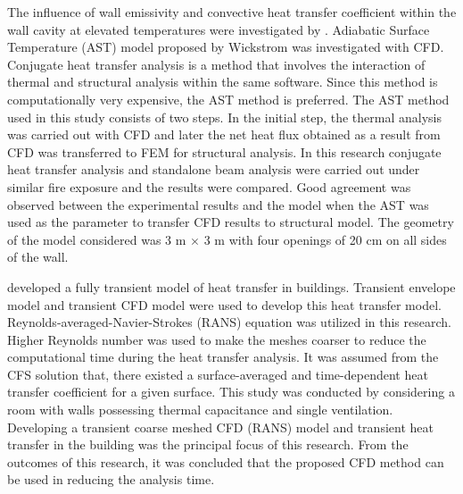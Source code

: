 The influence of wall emissivity and convective heat transfer coefficient within the wall cavity at elevated temperatures were investigated by \citet{Andreozzi2013}. Adiabatic Surface Temperature (AST) model proposed by Wickstrom was investigated with CFD. Conjugate heat transfer analysis is a method that involves the interaction of thermal and structural analysis within the same software. Since this method is computationally very expensive, the AST method is preferred. The AST method used in this study consists of two steps. In the initial step, the thermal analysis was carried out with CFD and later the net heat flux obtained as a result from CFD was transferred to FEM for structural analysis. In this research conjugate heat transfer analysis and standalone beam analysis were carried out under similar fire exposure and the results were compared. Good agreement was observed between the experimental results and the model when the AST was used as the parameter to transfer CFD results to structural model. The geometry of the model considered was 3 m \(\times\) 3 m with four openings of 20 cm on all sides of the wall.

\citet{Arendt2014} developed a fully transient model of heat transfer in buildings. Transient envelope model and transient CFD model were used to develop this heat transfer model. Reynolds-averaged-Navier-Strokes (RANS) equation was utilized in this research. Higher Reynolds number was used to make the meshes coarser to reduce the computational time during the heat transfer analysis. It was assumed from the CFS solution that, there existed a surface-averaged and time-dependent heat transfer coefficient for a given surface. This study was conducted by considering a room with walls possessing thermal capacitance and single ventilation. Developing a transient coarse meshed CFD (RANS) model and transient heat transfer in the building was the principal focus of this research. From the outcomes of this research, it was concluded that the proposed CFD method can be used in reducing the analysis time.

